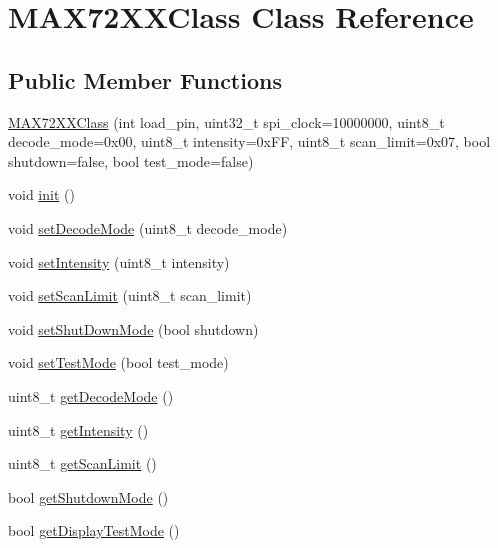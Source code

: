 \hypertarget{class_m_a_x72_x_x_class}{}\section{M\+A\+X72\+X\+X\+Class Class Reference}
\label{class_m_a_x72_x_x_class}
\subsection*{Public Member Functions}
\begin{DoxyCompactItemize}
\item 
\hyperlink{class_m_a_x72_x_x_class_ab45a341ff4776e620a1b72e5270a7de5}{M\+A\+X72\+X\+X\+Class} (int load\+\_\+pin, uint32\+\_\+t spi\+\_\+clock=10000000, uint8\+\_\+t decode\+\_\+mode=0x00, uint8\+\_\+t intensity=0x\+F\+F, uint8\+\_\+t scan\+\_\+limit=0x07, bool shutdown=false, bool test\+\_\+mode=false)
\item 
void \hyperlink{class_m_a_x72_x_x_class_a6211528689f9ab8d1846532776cc6264}{init} ()
\item 
void \hyperlink{class_m_a_x72_x_x_class_a8b17f33f608e635b9fdc4367a113adb7}{set\+Decode\+Mode} (uint8\+\_\+t decode\+\_\+mode)
\item 
void \hyperlink{class_m_a_x72_x_x_class_a407f26cf92360d93e9c5f0b91e5542cc}{set\+Intensity} (uint8\+\_\+t intensity)
\item 
void \hyperlink{class_m_a_x72_x_x_class_ac342306761ca24c478c446cf0682fb24}{set\+Scan\+Limit} (uint8\+\_\+t scan\+\_\+limit)
\item 
void \hyperlink{class_m_a_x72_x_x_class_ac3a9c6ddd4b2dce7431eb9e2d7d9d7ac}{set\+Shut\+Down\+Mode} (bool shutdown)
\item 
void \hyperlink{class_m_a_x72_x_x_class_acf32b644ce60843b684ae32446622dd6}{set\+Test\+Mode} (bool test\+\_\+mode)
\item 
uint8\+\_\+t \hyperlink{class_m_a_x72_x_x_class_a3d693ffd24fbc395a288fbe1283f2094}{get\+Decode\+Mode} ()
\item 
uint8\+\_\+t \hyperlink{class_m_a_x72_x_x_class_aea0075ed153b3b44c9539ca4cdeef8a7}{get\+Intensity} ()
\item 
uint8\+\_\+t \hyperlink{class_m_a_x72_x_x_class_a992d18c02ae07b71345fac7b235fed15}{get\+Scan\+Limit} ()
\item 
bool \hyperlink{class_m_a_x72_x_x_class_a3bd7b10cc348f46895378eeb553ababc}{get\+Shutdown\+Mode} ()
\item 
bool \hyperlink{class_m_a_x72_x_x_class_aa2368221152a810345dc7a309a430149}{get\+Display\+Test\+Mode} ()

\end{DoxyCompactItemize}
